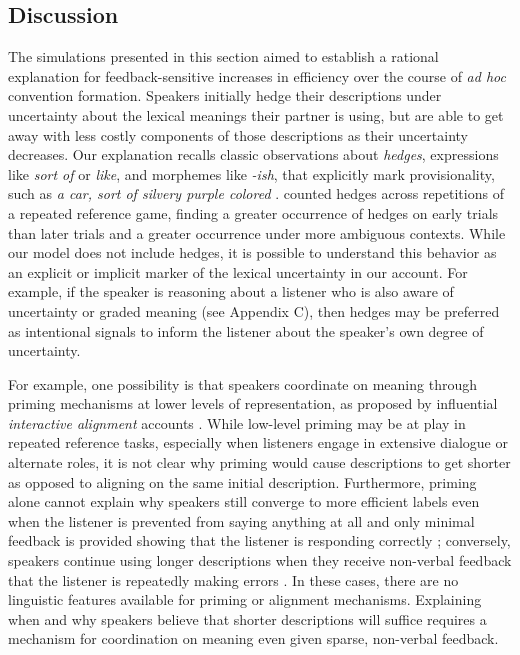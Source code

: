 \subsection{Discussion}

The simulations presented in this section aimed to establish a rational explanation for feedback-sensitive increases in efficiency over the course of \emph{ad hoc} convention formation.
Speakers initially hedge their descriptions under uncertainty about the lexical meanings their partner is using, but are able to get away with less costly components of those descriptions as their uncertainty decreases.
Our explanation recalls classic observations about \emph{hedges}, expressions like \emph{sort of} or \emph{like}, and morphemes like \emph{-ish}, that explicitly mark provisionality, such as \emph{a car, sort of silvery purple colored} \cite{Fraser10_Hedging,MedlockBriscoe07_HedgeClassification} .
 counted hedges across repetitions of a repeated reference game, finding a greater occurrence of hedges on early trials than later trials and a greater occurrence under more ambiguous contexts.
While our model does not include hedges, it is possible to understand this behavior as an explicit or implicit marker of the lexical uncertainty in our account.
For example, if the speaker is reasoning about a listener who is also aware of uncertainty or graded meaning (see Appendix C), then hedges may be preferred as intentional signals to inform the listener about the speaker's own degree of uncertainty.

For example, one possibility is that speakers coordinate on meaning through priming mechanisms at lower levels of representation, as proposed by influential  \emph{interactive alignment} accounts \cite{pickering2004toward, pickering2006alignment, garrod2009joint}.
While low-level priming may be at play in repeated reference tasks, especially when listeners engage in extensive dialogue or alternate roles, it is not clear why priming would cause descriptions to get shorter as opposed to aligning on the same initial description.
Furthermore, priming alone cannot explain why speakers still converge to more efficient labels even when the listener is prevented from saying anything at all and only minimal feedback is provided showing that the listener is responding correctly \cite{KraussWeinheimer66_Tangrams}; conversely, speakers continue using longer descriptions when they receive non-verbal feedback that the listener is repeatedly making errors \cite<see also>{hawkins2020characterizing}.
In these cases, there are no linguistic features available for priming or alignment mechanisms.
Explaining when and why speakers believe that shorter descriptions will suffice requires a mechanism for coordination on meaning even given sparse, non-verbal feedback.



